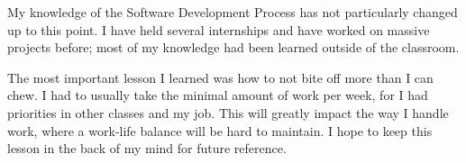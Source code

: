 \documentclass[12pt]{scrartcl}
\begin{document}
My knowledge of the Software Development Process has not particularly changed up to this point. I have held several internships and have worked on massive projects before; most of my knowledge had been learned outside of the classroom.

The most important lesson I learned was how to not bite off more than I can chew. I had to usually take the minimal amount of work per week, for I had priorities in other classes and my job. This will greatly impact the way I handle work, where a work-life balance will be hard to maintain. I hope to keep this lesson in the back of my mind for future reference.
\end{document}
